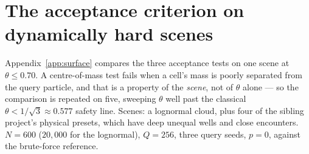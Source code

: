 \begin{table}[h]
\centering
\caption{Classification fidelity, the column that matters to a user of the tidal tensor: the fraction
of query nodes whose eigenvalue-sign class (the number of positive eigenvalues, which for a traceless
tensor is $1$ or $2$ --- see Section~\ref{sec:physics}) differs from the exact one, for the same rows
as Table~\ref{tab:eigen}. Post-D8 the worst rate in the table is $1.4\%$, and at fixed
$\theta=0.70$ the acceptance test no longer separates the two criteria --- what used to look like a
criterion effect was defect~D8.}\label{tab:flip}
\end{table}

\section{The acceptance criterion on dynamically hard scenes}\label{app:scenes}
Appendix~\ref{app:surface} compares the three acceptance tests on one scene at $\theta\le0.70$.
A centre-of-mass test fails when a cell's mass is poorly separated from the query particle, and that
is a property of the \emph{scene}, not of $\theta$ alone --- so the comparison is repeated on five,
sweeping $\theta$ well past the classical $\theta<1/\sqrt{3}\approx0.577$ safety line. Scenes: a
lognormal cloud, plus four of the sibling project's physical presets, which have deep unequal wells
and close encounters. $N=600$ ($20{,}000$ for the lognormal), $Q=256$, three query seeds, $p{=}0$,
against the brute-force reference.

